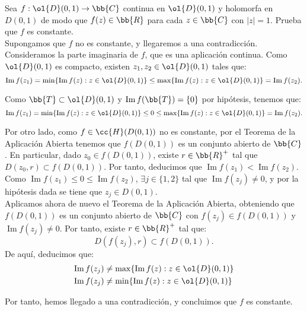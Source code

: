 \documentclass[12pt]{article}
\renewcommand{\Im}{\operatorname{Im}}
\begin{document}
    \begin{ejercicio}[2.5 puntos]
        Sea $f : \ol{D}(0, 1) \to \bb{C}$ continua en $\ol{D}(0, 1)$ y holomorfa en $D(0, 1)$ de modo que $f(z) \in \bb{R}$ para cada $z \in \bb{C}$ con $|z| = 1$. Prueba que $f$ es constante.\\

        Supongamos que $f$ no es constante, y llegaremos a una contradicción. Consideramos la parte imaginaria de $f$, que es una aplicación continua. Como $\ol{D}(0,1)$ es compacto, existen $z_1,z_2\in \ol{D}(0,1)$ tales que:
        \[
            \Im f(z_1) = \min\{\Im f(z) : z \in \ol{D}(0, 1)\}\leq \max\{\Im f(z) : z \in \ol{D}(0, 1)\} = \Im f(z_2).
        \]

        Como $\bb{T}\subset \ol{D}(0,1)$ y $\Im f(\bb{T})=\{0\}$ por hipótesis, tenemos que:
        \begin{equation*}
            \Im f(z_1) = \min\{\Im f(z) : z \in \ol{D}(0, 1)\}\leq 0\leq \max\{\Im f(z) : z \in \ol{D}(0, 1)\} = \Im f(z_2).
        \end{equation*}

        Por otro lado, como $f\in \cc{H}(D(0,1))$ no es constante, por el Teorema de la Aplicación Abierta tenemos que $f(D(0,1))$ es un conjunto abierto de $\bb{C}$. En particular, dado $z_0\in f(D(0,1))$, existe $r\in \bb{R}^+$ tal que $D(z_0,r)\subset f(D(0,1))$. Por tanto, deducimos que $\Im f(z_1)<\Im f(z_2)$.\\
        
        Como $\Im f(z_1)\leq 0\leq \Im f(z_2)$, $\exists j\in \{1,2\}$ tal que $\Im f(z_j) \neq 0$, y por la hipótesis dada se tiene que $z_j\in D(0,1)$.\\

        Aplicamos ahora de nuevo el Teorema de la Aplicación Abierta, obteniendo que $f(D(0,1))$ es un conjunto abierto de $\bb{C}$ con $f(z_j)\in f(D(0,1))$ y $\Im f(z_j) \neq 0$. Por tanto, existe $r\in \bb{R}^+$ tal que:
        \[
            D(f(z_j), r) \subset f(D(0,1)).
        \]
        De aquí, deducimos que:
        \begin{align*}
            \Im f(z_j) &\neq \max\{\Im f(z) : z \in \ol{D}(0, 1)\} \\
            \Im f(z_j) &\neq \min\{\Im f(z) : z \in \ol{D}(0, 1)\}
        \end{align*}

        Por tanto, hemos llegado a una contradicción, y concluimos que $f$ es constante.
    \end{ejercicio}
\end{document}
